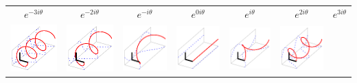 \begin{tabular}{ccccccc}
	$e^{-3i\theta}$ &
	$e^{-2i\theta}$ &
	$e^{-i\theta}$ &
	$e^{0i\theta}$ &
	$e^{i\theta}$ &
	$e^{2i\theta}$ &
	$e^{3i\theta}$ \\
	\includegraphics{monomial-3.png} &
	\includegraphics{monomial-2.png} &
	\includegraphics{monomial-1.png} &
	\includegraphics{monomial+0.png} &
	\includegraphics{monomial+1.png} &
	\includegraphics{monomial+2.png} &

\end{tabular}
